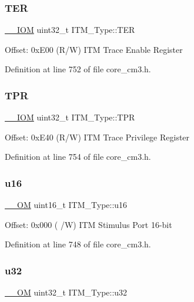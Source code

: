 \subsubsection{\texorpdfstring{T\+ER}{TER}}
{\footnotesize\ttfamily \hyperlink{core__sc300_8h_ab6caba5853a60a17e8e04499b52bf691}{\+\_\+\+\_\+\+I\+OM} uint32\+\_\+t I\+T\+M\+\_\+\+Type\+::\+T\+ER}

Offset\+: 0x\+E00 (R/W) I\+TM Trace Enable Register 

Definition at line 752 of file core\+\_\+cm3.\+h.

\mbox{\label{struct_i_t_m___type_ae907229ba50538bf370fbdfd54c099a2}} 
\subsubsection{\texorpdfstring{T\+PR}{TPR}}
{\footnotesize\ttfamily \hyperlink{core__sc300_8h_ab6caba5853a60a17e8e04499b52bf691}{\+\_\+\+\_\+\+I\+OM} uint32\+\_\+t I\+T\+M\+\_\+\+Type\+::\+T\+PR}

Offset\+: 0x\+E40 (R/W) I\+TM Trace Privilege Register 

Definition at line 754 of file core\+\_\+cm3.\+h.

\mbox{\label{struct_i_t_m___type_a962a970dfd286cad7f8a8577e87d4ad3}} 
\subsubsection{\texorpdfstring{u16}{u16}}
{\footnotesize\ttfamily \hyperlink{core__sc300_8h_a0ea2009ed8fd9ef35b48708280fdb758}{\+\_\+\+\_\+\+OM} uint16\+\_\+t I\+T\+M\+\_\+\+Type\+::u16}

Offset\+: 0x000 ( /W) I\+TM Stimulus Port 16-\/bit 

Definition at line 748 of file core\+\_\+cm3.\+h.

\mbox{\label{struct_i_t_m___type_a5834885903a557674f078f3b71fa8bc8}} 
\subsubsection{\texorpdfstring{u32}{u32}}
{\footnotesize\ttfamily \hyperlink{core__sc300_8h_a0ea2009ed8fd9ef35b48708280fdb758}{\+\_\+\+\_\+\+OM} uint32\+\_\+t I\+T\+M\+\_\+\+Type\+::u32}

